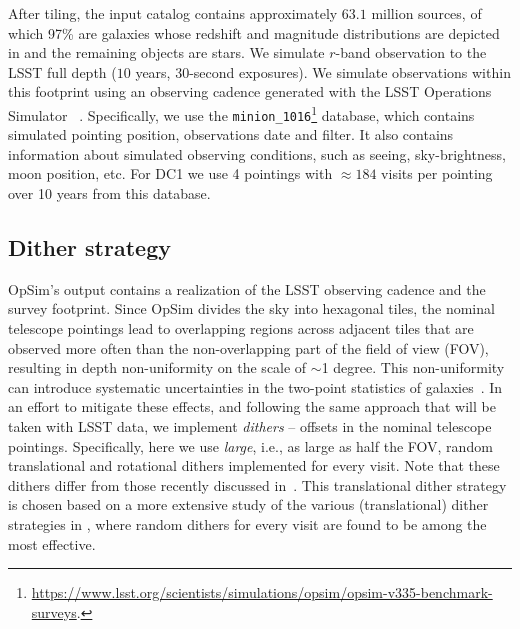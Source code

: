 \documentclass[a4paper,fleqn,usenatbib]{mnras}
\begin{document}

After tiling, the input catalog contains approximately $63.1$ million sources, of which 97\% are galaxies whose redshift and magnitude distributions are depicted in  and the remaining objects are stars. We simulate $r$-band observation to the LSST full depth ($10$ years, 30-second exposures). We simulate observations within this footprint using an observing cadence generated with the LSST Operations Simulator~ \citep[OpSim]{2014SPIE.9150E..15D}. Specifically, we use the \texttt{minion\_1016}\footnote{\url{https://www.lsst.org/scientists/simulations/opsim/opsim-v335-benchmark-surveys}.} database, which contains simulated pointing position, observations date and filter. It also contains information about simulated observing conditions, such as seeing, sky-brightness, moon position, etc. For DC1 we use 4 pointings with $\approx 184$ visits per pointing over 10 years from this database.

\subsection{Dither strategy}
\label{sec:dithering}

OpSim's output contains a realization of the LSST observing cadence and the survey footprint. Since OpSim divides the sky into hexagonal tiles, the nominal telescope pointings lead to overlapping regions across adjacent tiles that are observed more often than the non-overlapping part of the field of view (FOV), resulting in depth non-uniformity on the scale of $\sim$1 degree. This non-uniformity can introduce systematic uncertainties in the two-point statistics of galaxies~\citep{2016ApJ...829...50A}. In an effort to mitigate these effects, and following the same approach that will be taken with LSST data, we implement \textit{dithers} -- offsets in the nominal telescope pointings. Specifically, here we use \textit{large}, i.e., as large as half the FOV, random translational and rotational dithers implemented for every visit. Note that these dithers differ from those recently discussed in~\citet{2018arXiv181200515L}. This translational dither strategy is chosen based on a more extensive study of the various (translational) dither strategies in \citet{2016ApJ...829...50A}, where random dithers for every visit are found to be among the most effective.
\end{document}
